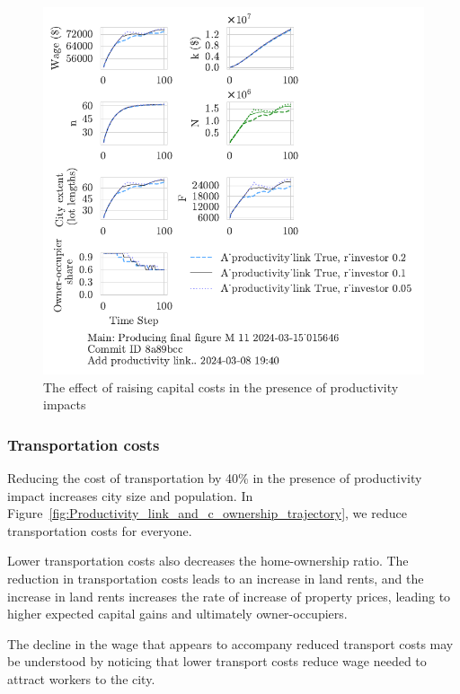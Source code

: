 {\begin{figure}[h!t]
    \centering
   \includegraphics[scale=.8, trim={0 1.4cm 0 0},clip]{fig/With-productivity_link-r_investor-15_015646.pdf}
    \caption{The effect of raising capital costs in the presence of productivity impacts}
    \label{fig:Productivity_link_and_capital_ownership_trajectory}
\end{figure}

\newpage  
\subsubsection{Transportation costs}
Reducing the cost of transportation  by 40\% in the presence of productivity impact increases city size and population. In Figure~\ref{fig:Productivity_link_and_c_ownership_trajectory}, we reduce transportation costs for everyone. 


Lower transportation costs also  decreases the home-ownership ratio. The reduction in transportation costs leads to an increase in land rents, and the increase in land rents increases the rate of increase of property prices, leading to higher expected capital gains and ultimately owner-occupiers. 

The decline in the wage that appears to accompany reduced transport costs may be understood by noticing that lower transport costs reduce  wage needed to attract workers to the city. 

}
